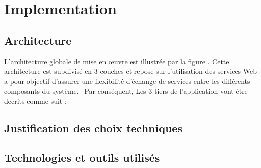 \chapter{Implementation}

\section{Architecture} %
\label{sec:architecture}
L’architecture globale de mise en œuvre est illustrée par la figure . Cette architecture est subdivisé en 3 couches et repose sur l’utilisation des services Web a pour objectif d’assurer une flexibilité d’échange de services entre les différents composants du système.
\newline\
Par conséquent, Les 3 tiers de l’application vont être decrits comme suit :
\clearpage

\section{Justification des choix techniques} %
\label{sec:justification_du_choix_technique}


\section{Technologies et outils utilisés} %
\label{sec:technologies_et_outils_utilisés}

